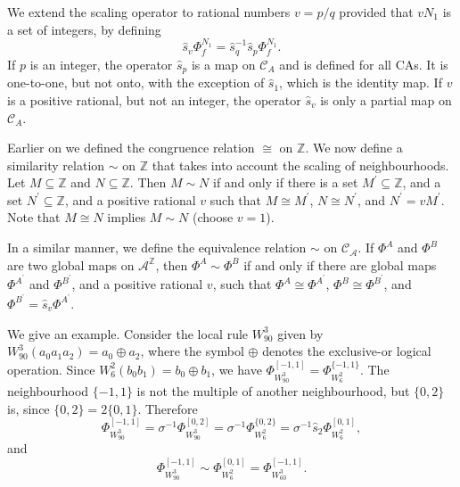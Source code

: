 \documentclass[a4paper]{article}
\begin{document}
We extend the scaling operator to rational numbers $v=p/q$ provided that $v N_1$ is a set of integers, by
defining
\[
\hat{s}_v \Phi^{N_1}_f = \hat{s}^{-1}_q \hat{s}_p \Phi^{N_1}_f.
\]
If $p$ is an integer, the operator $\hat{s}_p$ is a map on $\mathcal{C}_A$ and is defined for all CAs.
It is one-to-one, but not onto, with the exception of $\hat{s}_1$, which is the identity map.
If $v$ is a positive rational, but not an integer, the operator $\hat{s}_v$  is only a partial map on $\mathcal{C}_A$.

Earlier on we defined the congruence relation $\cong$ on $\mathbb{Z}$.
We now define a similarity relation $\sim$ on $\mathbb{Z}$ that takes into account the scaling of neighbourhoods.
Let $M \subseteq \mathbb{Z}$ and $N \subseteq \mathbb{Z}$.
Then $M \sim N$ if and only if there is a set $M^\prime \subseteq \mathbb{Z}$,
and a set $N^\prime \subseteq \mathbb{Z}$, and a positive rational $v$ such that
$M \cong M^\prime$, $N \cong N^\prime$, and $N^\prime = v M^\prime$.
Note that $M \cong N$ implies $M \sim N$ (choose $v=1$).

In a similar manner, we define the equivalence relation $\sim$ on $\mathcal{C}_\mathcal{A}$.
If $\Phi^A$ and $\Phi^B$ are two global maps on $\mathcal{A}^\mathbb{Z}$,
then $\Phi^A \sim \Phi^B$ if and only if
there are global maps $\Phi^{A^\prime}$ and $\Phi^{B^\prime}$, and a positive rational $v$,
such that $\Phi^A \cong \Phi^{A^\prime}$, $\Phi^B \cong \Phi^{B^\prime}$,
and $\Phi^{B^\prime} = \hat{s}_v \Phi^{A^\prime}$.

We give an example.
Consider the local rule $W^3_{90}$ given by $W^3_{90}(a_0a_1a_2) = a_0 \oplus a_2$,
where the symbol $\oplus$ denotes the exclusive-or logical operation.
Since $W^2_6(b_0b_1) = b_0 \oplus b_1$, we have
$\Phi^{[-1,1]}_{W^3_{90}} = \Phi^{\{-1,1\}}_{W^2_6}$.
The neighbourhood $\{-1,1\}$ is not the multiple of another neighbourhood, but
$\{0,2\}$ is, since $\{0,2\} = 2 \{0,1\}$.
Therefore
\[
\Phi^{[-1,1]}_{W^3_{90}} = \sigma^{-1} \Phi^{[0,2]}_{W^3_{90}} =
\sigma^{-1} \Phi^{\{0,2\}}_{W^2_6} = \sigma^{-1} \hat{s}_2 \Phi^{[0,1]}_{W^2_6},
\]
and
\[
\Phi^{[-1,1]}_{W^3_{90}} \sim \Phi^{[0,1]}_{W^2_6} = \Phi^{[-1,1]}_{W^3_{60}}.
\]
\end{document}
